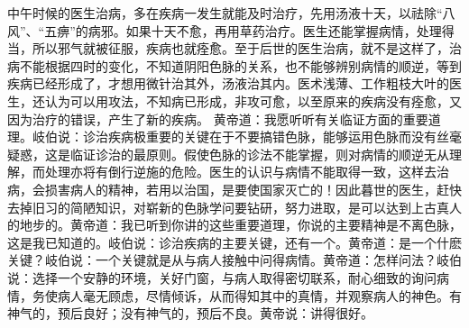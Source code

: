 \documentclass[a4paper,12pt,UTF8,twoside]{ctexbook}
\begin{document}
中午时候的医生治病，多在疾病一发生就能及时治疗，先用汤液十天，以祛除“八风”、“五痹”的病邪。如果十天不愈，再用草药治疗。医生还能掌握病情，处理得当，所以邪气就被征服，疾病也就痊愈。至于后世的医生治病，就不是这样了，治病不能根据四时的变化，不知道阴阳色脉的关系，也不能够辨别病情的顺逆，等到疾病已经形成了，才想用微针治其外，汤液治其内。医术浅薄、工作粗枝大叶的医生，还认为可以用攻法，不知病已形成，非攻可愈，以至原来的疾病没有痊愈，又因为治疗的错误，产生了新的疾病。
黄帝道：我愿听听有关临证方面的重要道理。岐伯说：诊治疾病极重要的关键在于不要搞错色脉，能够运用色脉而没有丝毫疑惑，这是临证诊治的最原则。假使色脉的诊法不能掌握，则对病情的顺逆无从理解，而处理亦将有倒行逆施的危险。医生的认识与病情不能取得一致，这样去治病，会损害病人的精神，若用以治国，是要使国家灭亡的！因此暮世的医生，赶快去掉旧习的简陋知识，对崭新的色脉学问要钻研，努力进取，是可以达到上古真人的地步的。黄帝道：我已听到你讲的这些重要道理，你说的主要精神是不离色脉，这是我已知道的。岐伯说：诊治疾病的主要关键，还有一个。黄帝道：是一个什麽关键？岐伯说：一个关键就是从与病人接触中问得病情。黄帝道：怎样问法？岐伯说：选择一个安静的环境，关好门窗，与病人取得密切联系，耐心细致的询问病情，务使病人毫无顾虑，尽情倾诉，从而得知其中的真情，并观察病人的神色。有神气的，预后良好；没有神气的，预后不良。黄帝说：讲得很好。
\end{document}
